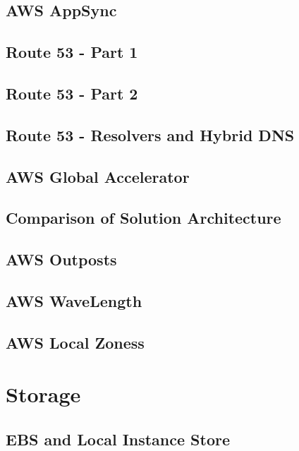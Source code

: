 \documentclass[11pt]{book}
\begin{document}
    \section{AWS AppSync}


    \section{Route 53 - Part 1}


    \section{Route 53 - Part 2}


    \section{Route 53 - Resolvers and Hybrid DNS}


    \section{AWS Global Accelerator}


    \section{Comparison of Solution Architecture}


    \section{AWS Outposts}


    \section{AWS WaveLength}


    \section{AWS Local Zoness}


    \chapter{Storage}


    \section{EBS and Local Instance Store}
\end{document}
